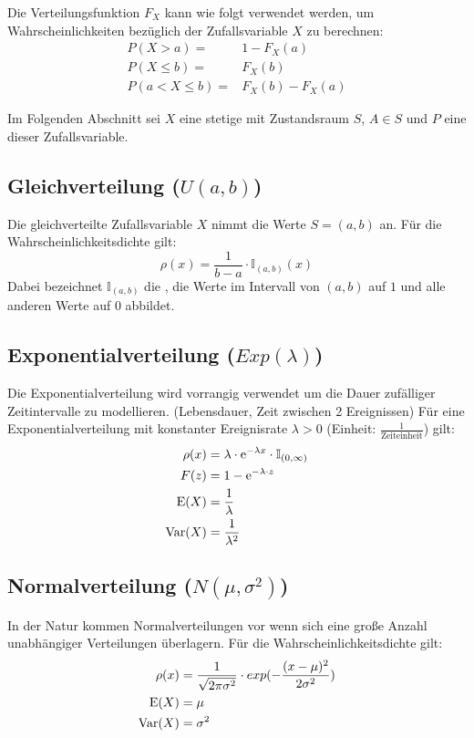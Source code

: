 Die Verteilungsfunktion $F_X$ kann wie folgt verwendet werden, um
Wahrscheinlichkeiten bezüglich der Zufallsvariable $X$ zu berechnen:
\begin{align*}
P(X>a) = &1 - F_X(a) \\
P(X\le b) = &F_X(b) \\
P(a < X \le b) = &F_X(b) - F_X(a)
\end{align*}

Im Folgenden Abschnitt sei $X$ eine stetige 
mit Zustandsraum $S$, $A \in S$ und $P$ eine
 dieser Zufallsvariable.


\subsection{Gleichverteilung ($U(a,b)$)}
\label{vert-gleich}

Die gleichverteilte Zufallsvariable $X$ nimmt die Werte $S=(a,b)$ an. Für die
Wahrscheinlichkeitsdichte gilt:
\[
\rho(x) = \frac{1}{b-a}\cdot\mathbb{I}_{(a,b)}(x)
\]
Dabei bezeichnet $\mathbb{I}_{(a,b)}$ die , die Werte im
Intervall von $(a,b)$ auf $1$ und alle anderen Werte auf $0$ abbildet.

\subsection{Exponentialverteilung ($Exp(\lambda)$)}
\label{vert-exp}

Die Exponentialverteilung wird vorrangig verwendet um die Dauer zufälliger 
Zeitintervalle zu modellieren. (Lebensdauer, Zeit zwischen 2 Ereignissen)
Für eine Exponentialverteilung mit konstanter Ereignisrate 
$\lambda > 0$ (Einheit: $\frac{1}{\text{Zeiteinheit}}$) gilt:
\begin{align*}
\rho(x) &= \lambda\cdot \mathrm{e}^{-\lambda x}\cdot\mathbb{I}_{(0, \infty)} \\
F(z) &= 1 - \mathrm{e}^{-\lambda\cdot z} \\
\operatorname{E}(X) &= \frac{1}{\lambda} \\
\operatorname{Var}(X) &= \frac{1}{\lambda^2}
\end{align*}

\subsection{Normalverteilung ($N(\mu, \sigma^2)$)}

In der Natur kommen Normalverteilungen vor wenn sich eine große Anzahl
unabhängiger Verteilungen überlagern. Für die Wahrscheinlichkeitsdichte gilt:
\begin{align*}
\rho(x) &= \frac{1}{\sqrt{2\pi\sigma^2}}\cdot exp(-\frac{(x-\mu)^2}{2\sigma^2}) \\
\operatorname{E}(X) &= \mu \\
\operatorname{Var}(X) &= \sigma^2
\end{align*}

